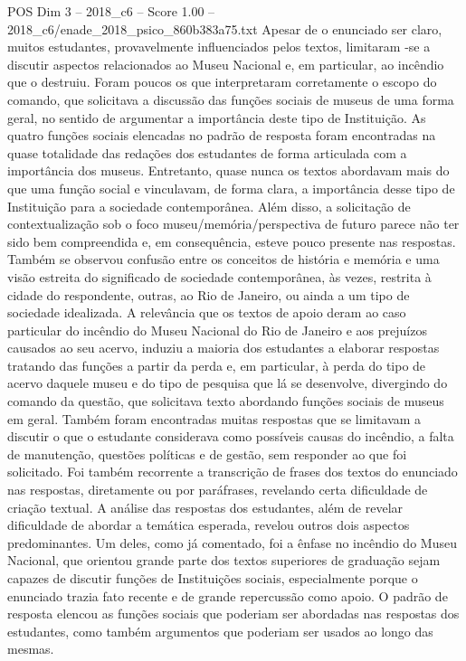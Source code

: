 \begin{textsample}{POS Dim 3 – 2018\_c6 – Score 1.00 – 2018\_c6/enade\_2018\_psico\_860b383a75.txt}
Apesar de o enunciado ser claro, muitos estudantes, provavelmente influenciados pelos textos, limitaram -se a discutir aspectos relacionados ao Museu Nacional e, em particular, ao incêndio que o destruiu.
Foram poucos os que interpretaram corretamente o escopo do comando, que solicitava a discussão das funções sociais de museus de uma forma geral, no sentido de argumentar a importância deste tipo de Instituição.
As quatro funções sociais elencadas no padrão de resposta foram encontradas na quase totalidade das redações dos estudantes de forma articulada com a importância dos museus.
Entretanto, quase nunca os textos abordavam mais do que uma função social e vinculavam, de forma clara, a importância desse tipo de Instituição para a sociedade contemporânea.
Além disso, a solicitação de contextualização sob o foco museu/memória/perspectiva de futuro parece não ter sido bem compreendida e, em consequência, esteve pouco presente nas respostas.
Também se observou confusão entre os conceitos de história e memória e uma visão estreita do significado de sociedade contemporânea, às vezes, restrita à cidade do respondente, outras, ao Rio de Janeiro, ou ainda a um tipo de sociedade idealizada.
A relevância que os textos de apoio deram ao caso particular do incêndio do Museu Nacional do Rio de Janeiro e aos prejuízos causados ao seu acervo, induziu a maioria dos estudantes a elaborar respostas tratando das funções a partir da perda e, em particular, à perda do tipo de acervo daquele museu e do tipo de pesquisa que lá se desenvolve, divergindo do comando da questão, que solicitava texto abordando funções sociais de museus em geral.
Também foram encontradas muitas respostas que se limitavam a discutir o que o estudante considerava como possíveis causas do incêndio, a falta de manutenção, questões políticas e de gestão, sem responder ao que foi solicitado.
Foi também recorrente a transcrição de frases dos textos do enunciado nas respostas, diretamente ou por paráfrases, revelando certa dificuldade de criação textual.
A análise das respostas dos estudantes, além de revelar dificuldade de abordar a temática esperada, revelou outros dois aspectos predominantes.
Um deles, como já comentado, foi a ênfase no incêndio do Museu Nacional, que orientou grande parte dos textos superiores de graduação sejam capazes de discutir funções de Instituições sociais, especialmente porque o enunciado trazia fato recente e de grande repercussão como apoio.
O padrão de resposta elencou as funções sociais que poderiam ser abordadas nas respostas dos estudantes, como também argumentos que poderiam ser usados ao longo das mesmas.

\end{textsample}
